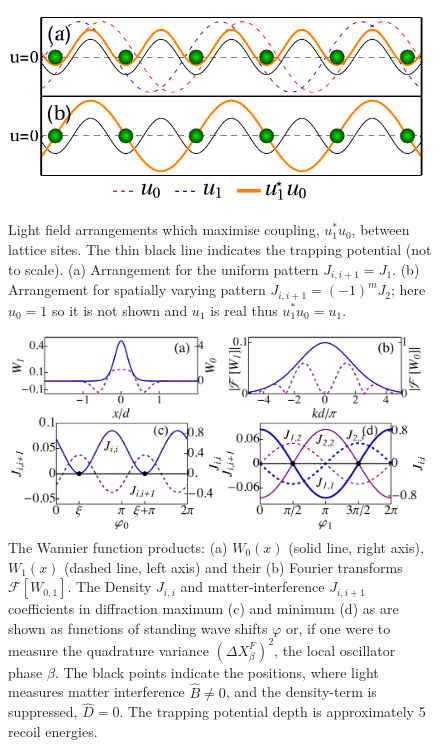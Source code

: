 \begin{figure}
  \centering
  \includegraphics[width=0.8\linewidth]{BDiagram}
  \caption[Maximising Light-Matter Coupling between Lattice
  Sites]{Light field arrangements which maximise coupling, $u_1^*u_0$,
    between lattice sites. The thin black line indicates the trapping
    potential (not to scale). (a) Arrangement for the uniform pattern
    $J_{i,i+1} = J_1$. (b) Arrangement for spatially varying pattern
    $J_{i,i+1}=(-1)^m J_2$; here $u_0=1$ so it is not shown and $u_1$
    is real thus $u_1^*u_0=u_1$. \label{fig:BDiagram}}
\end{figure}

\begin{figure}
  \centering
  \includegraphics[width=\linewidth]{WF_S}
  \caption[Wannier Function Products]{The Wannier function products:
    (a) $W_0(x)$ (solid line, right axis), $W_1(x)$ (dashed line, left
    axis) and their (b) Fourier transforms $\mathcal{F}[W_{0,1}]$. The
    Density $J_{i,i}$ and matter-interference $J_{i,i+1}$ coefficients
    in diffraction maximum (c) and minimum (d) as are shown as
    functions of standing wave shifts $\varphi$ or, if one were to
    measure the quadrature variance $(\Delta X^F_\beta)^2$, the local
    oscillator phase $\beta$. The black points indicate the positions,
    where light measures matter interference $\hat{B} \ne 0$, and the
    density-term is suppressed, $\hat{D} = 0$. The trapping potential
    depth is approximately 5 recoil energies.}
  \label{fig:WannierProducts}
\end{figure}

